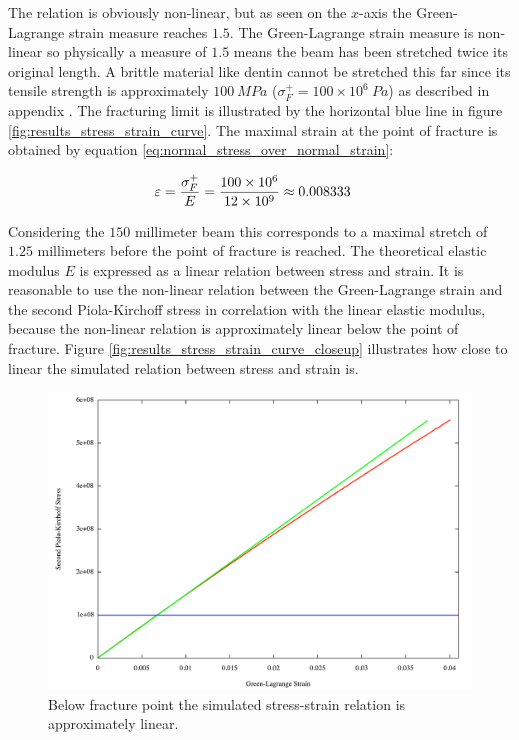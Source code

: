 The relation is obviously non-linear, but as seen on the $x$-axis the
Green-Lagrange strain measure reaches $1.5$. The Green-Lagrange
strain measure is non-linear so physically a measure of $1.5$ means
the beam has been stretched twice its original length. A brittle material like dentin
cannot be stretched this far since its tensile strength is
approximately $100 \ MPa$ ($\sigma^+_F = 100 \times 10^6 \ Pa$)
as described in appendix . The fracturing limit
is illustrated by the horizontal blue line in figure
\vref{fig:results_stress_strain_curve}. 
The maximal strain at the point of fracture is obtained by equation
\eqref{eq:normal_stress_over_normal_strain}:

\begin{align*}
  \varepsilon &= \frac{\sigma^+_F}{E} \vspace{2mm} 
  = \frac{100 \times 10^6}{12 \times 10^9} \vspace{2mm}
  \approx 0.008333
\end{align*}

Considering the $150$ millimeter beam this corresponds to a maximal
stretch of $1.25$ millimeters before the point of fracture is reached.
%
The theoretical elastic modulus $E$ is expressed as a linear relation between
stress and strain. It is reasonable to use the non-linear relation
between the Green-Lagrange strain and the second Piola-Kirchoff stress
in correlation with the linear elastic modulus, because the non-linear
relation is approximately linear below the point of fracture. Figure
\vref{fig:results_stress_strain_curve_closeup} illustrates how close to
linear the simulated relation between stress and strain is.

\begin{figure}
    \centering
    \includegraphics[width=140mm]{./images/results_ssc_dentine_closeup.pdf}
    \caption{Below fracture point the simulated stress-strain relation
      is approximately linear.}
    \label{fig:results_stress_strain_curve_closeup}
\end{figure}

